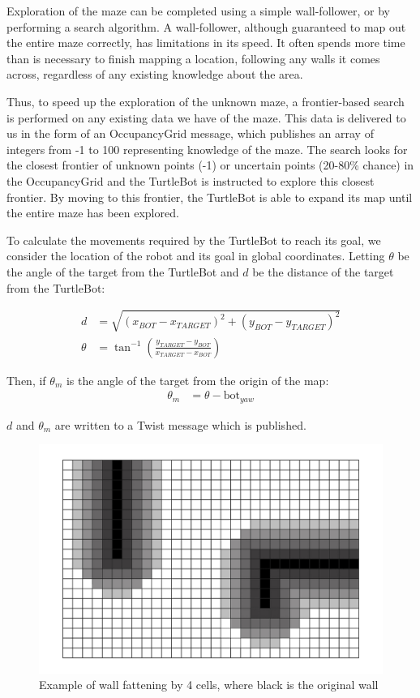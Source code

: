 \documentclass[titlepage,12pt,a4paper]{article}
\begin{document}
Exploration of the maze can be completed using a simple wall-follower, or by performing a search algorithm. A wall-follower, although guaranteed to map out the entire maze correctly, has limitations in its speed. It often spends more time than is necessary to finish mapping a location, following any walls it comes across, regardless of any existing knowledge about the area.

Thus, to speed up the exploration of the unknown maze, a frontier-based search is performed on any existing data we have of the maze. This data is delivered to us in the form of an OccupancyGrid message, which publishes an array of integers from -1 to 100 representing knowledge of the maze. The search looks for the closest frontier of unknown points (-1) or uncertain points (20-80\% chance) in the OccupancyGrid and the TurtleBot is instructed to explore this closest frontier. By moving to this frontier, the TurtleBot is able to expand its map until the entire maze has been explored. 

To calculate the movements required by the TurtleBot to reach its goal, we consider the location of the robot and its goal in global coordinates. Letting $\theta$ be the angle of the target from the TurtleBot and $d$ be the distance of the target from the TurtleBot:

\begin{align*}
	d			&=	\sqrt{(x_{BOT} - x_{TARGET})^2 + (y_{BOT} - y_{TARGET})^2} \\
	\theta		&=	\tan^{-1}{(\frac{y_{TARGET} - y_{BOT}}{x_{TARGET} - x_{BOT}})} 
\end{align*}

Then, if $\theta_m$ is the angle of the target from the origin of the map:
\begin{align*}
		\theta_m 	&=	\theta - \text{bot}_{yaw} 
\end{align*}

$d$ and $\theta_m$ are written to a Twist message which is published.

\begin{figure}[h]
	\begin{center}
	\includegraphics[scale=0.25]{wallfatten.jpg}
	\caption{Example of wall fattening by 4 cells, where black is the original wall}
	\end{center}
\end{figure}
\end{document}
